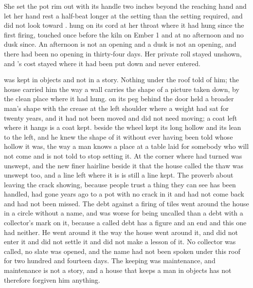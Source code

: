 She set the pot rim out with its handle two inches beyond the reaching hand and let her hand rest a half-beat longer at the setting than the setting required, and did not look toward .  hung on its cord at her throat where it had hung since the first firing, touched once before the kiln on Ember 1 and at no afternoon and no dusk since. An afternoon is not an opening and a dusk is not an opening, and there had been no opening in thirty-four days. Her private roll stayed unshown, and 's cost stayed where it had been put down and never entered.

\scenebreak

 was kept in objects and not in a story. Nothing under the roof told of him; the house carried him the way a wall carries the shape of a picture taken down, by the clean place where it had hung.  on its peg behind the door held a broader man's shape with the crease at the left shoulder where a weight had sat for twenty years, and it had not been moved and did not need moving; a coat left where it hangs is a coat kept.  beside the wheel kept its long hollow and its lean to the left, and he knew the shape of it without ever having been told whose hollow it was, the way a man knows a place at a table laid for somebody who will not come and is not told to stop setting it. At the corner  where  had turned was unswept, and the new finer hairline beside it that the house called the thaw was unswept too, and a line left where it is is still a line kept. The proverb about leaving the crack showing, because people trust a thing they can see has been handled, had gone years ago to a pot with no crack in it and had not come back and had not been missed. The debt against a firing of tiles went around the house in a circle without a name, and was worse for being uncalled than a debt with a collector's mark on it, because a called debt has a figure and an end and this one had neither. He went around it the way the house went around it, and did not enter it and did not settle it and did not make a lesson of it. No collector was called, no slate was opened, and the name had not been spoken under this roof for two hundred and fourteen days. The keeping was maintenance, and maintenance is not a story, and a house that keeps a man in objects has not therefore forgiven him anything.

